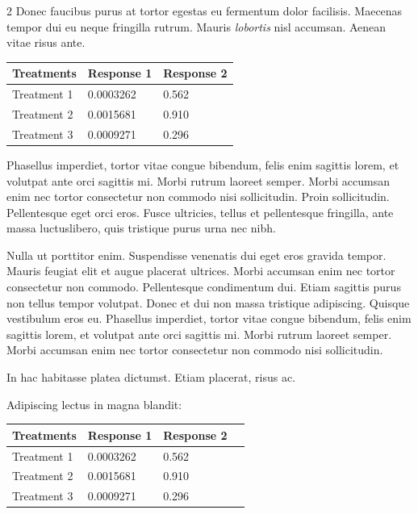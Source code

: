 \documentclass[a0,portrait]{a0poster}
\begin{document}
\begin{multicols}{2}
Donec faucibus purus at tortor egestas eu fermentum dolor facilisis. Maecenas tempor dui eu neque fringilla rutrum. Mauris \emph{lobortis} nisl accumsan. Aenean vitae risus ante.
%
\begin{table} %
\begin{tabular}{l l l}
\toprule
\textbf{Treatments} & \textbf{Response 1} & \textbf{Response 2}\\
\midrule
Treatment 1 & 0.0003262 & 0.562 \\
Treatment 2 & 0.0015681 & 0.910 \\
Treatment 3 & 0.0009271 & 0.296 \\
\bottomrule
\end{tabular}
\end{table}
%
Phasellus imperdiet, tortor vitae congue bibendum, felis enim sagittis lorem, et volutpat ante orci sagittis mi. Morbi rutrum laoreet semper. Morbi accumsan enim nec tortor consectetur non commodo nisi sollicitudin. Proin sollicitudin. Pellentesque eget orci eros. Fusce ultricies, tellus et pellentesque fringilla, ante massa luctuslibero, quis tristique purus urna nec nibh.

Nulla ut porttitor enim. Suspendisse venenatis dui eget eros gravida tempor. Mauris feugiat elit et augue placerat ultrices. Morbi accumsan enim nec tortor consectetur non commodo. Pellentesque condimentum dui. Etiam sagittis purus non tellus tempor volutpat. Donec et dui non massa tristique adipiscing. Quisque vestibulum eros eu. Phasellus imperdiet, tortor vitae congue bibendum, felis enim sagittis lorem, et volutpat ante orci sagittis mi. Morbi rutrum laoreet semper. Morbi accumsan enim nec tortor consectetur non commodo nisi sollicitudin.

\begin{center}\vspace{1cm}

\end{center}\vspace{1cm}

In hac habitasse platea dictumst. Etiam placerat, risus ac.

Adipiscing lectus in magna blandit:

\begin{center}\vspace{1cm}
\begin{tabular}{l l l l}
\toprule
\textbf{Treatments} & \textbf{Response 1} & \textbf{Response 2} \\
\midrule
Treatment 1 & 0.0003262 & 0.562 \\
Treatment 2 & 0.0015681 & 0.910 \\
Treatment 3 & 0.0009271 & 0.296 \\
\bottomrule
\end{tabular}
\end{center}\vspace{1cm}


\end{multicols}
\end{document}
